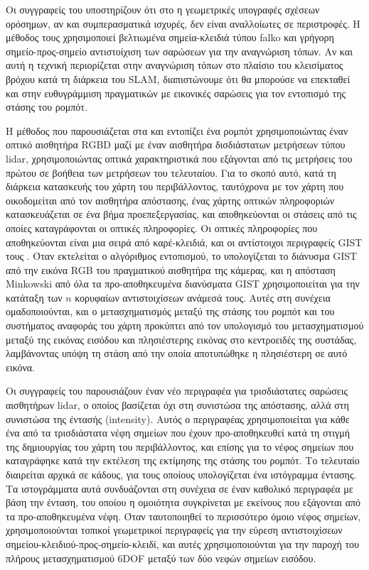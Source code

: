 Οι συγγραφείς του \cite{Kallasi2016} υποστηρίζουν ότι στο \cite{Himstedt2014} η
γεωμετρικές υπογραφές σχέσεων ορόσημων, αν και συμπερασματικά ισχυρές, δεν
είναι αναλλοίωτες σε περιστροφές. Η μέθοδος τους χρησιμοποιεί βελτιωμένα
σημεία-κλειδιά τύπου falko και γρήγορη σημείο-προς-σημείο αντιστοίχιση των
σαρώσεων για την αναγνώριση τόπων. Αν και αυτή η τεχνική περιορίζεται στην
αναγνώριση τόπων στο πλαίσιο του κλεισίματος βρόχου κατά τη διάρκεια του SLAM,
διαπιστώνουμε ότι θα μπορούσε να επεκταθεί και στην ευθυγράμμιση πραγματικών με
εικονικές σαρώσεις για τον εντοπισμό της στάσης του ρομπότ.

Η μέθοδος που παρουσιάζεται στα \cite{Su2017} και \cite{Chen2019b} εντοπίζει
ένα ρομπότ χρησιμοποιώντας έναν οπτικό αισθητήρα RGBD μαζί με έναν αισθητήρα
δισδιάστατων μετρήσεων τύπου lidar, χρησιμοποιώντας οπτικά χαρακτηριστικά που
εξάγονται από τις μετρήσεις του πρώτου σε βοήθεια των μετρήσεων του τελευταίου.
Για το σκοπό αυτό, κατά τη διάρκεια κατασκευής του χάρτη του περιβάλλοντος,
ταυτόχρονα με τον χάρτη που οικοδομείται από τον αισθητήρα απόστασης, ένας
χάρτης οπτικών πληροφοριών κατασκευάζεται σε ένα βήμα προεπεξεργασίας, και
αποθηκεύονται οι στάσεις από τις οποίες καταγράφονται οι οπτικές πληροφορίες.
Οι οπτικές πληροφορίες που αποθηκεύονται είναι μια σειρά από καρέ-κλειδιά, και
οι αντίστοιχοι περιγραφείς GIST τους \cite{Azzi2015,Singh2010}. Όταν εκτελείται
ο αλγόριθμος εντοπισμού, το υπολογίζεται το διάνυσμα GIST από την εικόνα RGB
του πραγματικού αισθητήρα της κάμερας, και η απόσταση Minkowski από όλα τα
προ-αποθηκευμένα διανύσματα GIST χρησιμοποιείται για την κατάταξη των $n$
κορυφαίων αντιστοιχίσεων ανάμεσά τους.  Αυτές στη συνέχεια ομαδοποιούνται, και
ο μετασχηματισμός μεταξύ της στάσης του ρομπότ και του συστήματος αναφοράς του
χάρτη προκύπτει από τον υπολογισμό του μετασχηματισμού μεταξύ της εικόνας
εισόδου και πλησιέστερης εικόνας στο κεντροειδές της συστάδας, λαμβάνοντας
υπόψη τη στάση από την οποία αποτυπώθηκε η πλησιέστερη σε αυτό εικόνα.

Οι συγγραφείς του \cite{Cop2018} παρουσιάζουν έναν νέο περιγραφέα για
τρισδιάστατες σαρώσεις αισθητήρων lidar, ο οποίος βασίζεται όχι στη συνιστώσα
της απόστασης, αλλά στη συνιστώσα της έντασής (intensity). Αυτός ο περιγραφέας
χρησιμοποιείται για κάθε ένα από τα τρισδιάστατα νέφη σημείων που έχουν
προ-αποθηκευθεί κατά τη στιγμή της δημιουργίας του χάρτη του περιβάλλοντος, και
επίσης για το νέφος σημείων που καταγράφηκε κατά την εκτέλεση της εκτίμησης της
στάσης του ρομπότ.  Το τελευταίο διαιρείται αρχικά σε κάδους, για τους οποίους
υπολογίζεται ένα ιστόγραμμα έντασης. Τα ιστογράμματα αυτά συνδυάζονται στη
συνέχεια σε έναν καθολικό περιγραφέα με βάση την ένταση, του οποίου η ομοιότητα
συγκρίνεται με εκείνους που εξάγονται από τα προ-αποθηκευμένα νέφη. Όταν
ταυτοποιηθεί το περισσότερο όμοιο νέφος σημείων, χρησιμοποιούνται τοπικοί
γεωμετρικοί περιγραφείς για την εύρεση αντιστοιχίσεων
σημείου-κλειδιού-προς-σημείο-κλειδί, και αυτές χρησιμοποιούνται για την παροχή
του πλήρους μετασχηματισμού 6DOF μεταξύ των δύο νεφών σημείων εισόδου.

